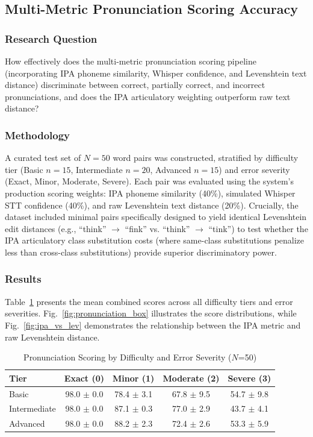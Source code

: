 \documentclass{IEEEtran}
\begin{document}
\subsection{Multi-Metric Pronunciation Scoring Accuracy}

\subsubsection{Research Question}
How effectively does the multi-metric pronunciation scoring pipeline (incorporating IPA phoneme similarity, Whisper confidence, and Levenshtein text distance) discriminate between correct, partially correct, and incorrect pronunciations, and does the IPA articulatory weighting outperform raw text distance?

\subsubsection{Methodology}
A curated test set of $N=50$ word pairs was constructed, stratified by difficulty tier (Basic $n=15$, Intermediate $n=20$, Advanced $n=15$) and error severity (Exact, Minor, Moderate, Severe). Each pair was evaluated using the system's production scoring weights: IPA phoneme similarity (40\%), simulated Whisper STT confidence (40\%), and raw Levenshtein text distance (20\%). Crucially, the dataset included minimal pairs specifically designed to yield identical Levenshtein edit distances (e.g., ``think'' $\rightarrow$ ``fink'' vs. ``think'' $\rightarrow$ ``tink'') to test whether the IPA articulatory class substitution costs (where same-class substitutions penalize less than cross-class substitutions) provide superior discriminatory power.

\subsubsection{Results}
Table~\ref{tab:pronunciation} presents the mean combined scores across all difficulty tiers and error severities. Fig.~\ref{fig:pronunciation_box} illustrates the score distributions, while Fig.~\ref{fig:ipa_vs_lev} demonstrates the relationship between the IPA metric and raw Levenshtein distance.

\begin{table}[!t]
\caption{Pronunciation Scoring by Difficulty and Error Severity ($N$=50)}
\label{tab:pronunciation}
\centering
\begin{tabular}{lcccc}
\toprule
\textbf{Tier} & \textbf{Exact (0)} & \textbf{Minor (1)} & \textbf{Moderate (2)} & \textbf{Severe (3)} \\
\midrule
Basic        & 98.0 $\pm$ 0.0 & 78.4 $\pm$ 3.1 & 67.8 $\pm$ 9.5 & 54.7 $\pm$ 9.8 \\
Intermediate & 98.0 $\pm$ 0.0 & 87.1 $\pm$ 0.3 & 77.0 $\pm$ 2.9 & 43.7 $\pm$ 4.1 \\
Advanced     & 98.0 $\pm$ 0.0 & 88.2 $\pm$ 2.3 & 72.4 $\pm$ 2.6 & 53.3 $\pm$ 5.9 \\
\bottomrule
\end{tabular}
\end{table}
\end{document}
